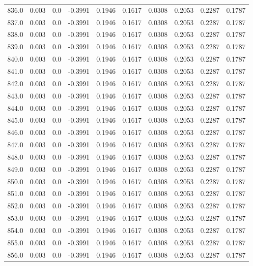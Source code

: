 \begin{longtable}{lrrrrrrrrr}
836.0 & 0.003 & 0.0 & -0.3991 & 0.1946 & 0.1617 & 0.0308 & 0.2053 & 0.2287 & 0.1787 \\
837.0 & 0.003 & 0.0 & -0.3991 & 0.1946 & 0.1617 & 0.0308 & 0.2053 & 0.2287 & 0.1787 \\
838.0 & 0.003 & 0.0 & -0.3991 & 0.1946 & 0.1617 & 0.0308 & 0.2053 & 0.2287 & 0.1787 \\
839.0 & 0.003 & 0.0 & -0.3991 & 0.1946 & 0.1617 & 0.0308 & 0.2053 & 0.2287 & 0.1787 \\
840.0 & 0.003 & 0.0 & -0.3991 & 0.1946 & 0.1617 & 0.0308 & 0.2053 & 0.2287 & 0.1787 \\
841.0 & 0.003 & 0.0 & -0.3991 & 0.1946 & 0.1617 & 0.0308 & 0.2053 & 0.2287 & 0.1787 \\
842.0 & 0.003 & 0.0 & -0.3991 & 0.1946 & 0.1617 & 0.0308 & 0.2053 & 0.2287 & 0.1787 \\
843.0 & 0.003 & 0.0 & -0.3991 & 0.1946 & 0.1617 & 0.0308 & 0.2053 & 0.2287 & 0.1787 \\
844.0 & 0.003 & 0.0 & -0.3991 & 0.1946 & 0.1617 & 0.0308 & 0.2053 & 0.2287 & 0.1787 \\
845.0 & 0.003 & 0.0 & -0.3991 & 0.1946 & 0.1617 & 0.0308 & 0.2053 & 0.2287 & 0.1787 \\
846.0 & 0.003 & 0.0 & -0.3991 & 0.1946 & 0.1617 & 0.0308 & 0.2053 & 0.2287 & 0.1787 \\
847.0 & 0.003 & 0.0 & -0.3991 & 0.1946 & 0.1617 & 0.0308 & 0.2053 & 0.2287 & 0.1787 \\
848.0 & 0.003 & 0.0 & -0.3991 & 0.1946 & 0.1617 & 0.0308 & 0.2053 & 0.2287 & 0.1787 \\
849.0 & 0.003 & 0.0 & -0.3991 & 0.1946 & 0.1617 & 0.0308 & 0.2053 & 0.2287 & 0.1787 \\
850.0 & 0.003 & 0.0 & -0.3991 & 0.1946 & 0.1617 & 0.0308 & 0.2053 & 0.2287 & 0.1787 \\
851.0 & 0.003 & 0.0 & -0.3991 & 0.1946 & 0.1617 & 0.0308 & 0.2053 & 0.2287 & 0.1787 \\
852.0 & 0.003 & 0.0 & -0.3991 & 0.1946 & 0.1617 & 0.0308 & 0.2053 & 0.2287 & 0.1787 \\
853.0 & 0.003 & 0.0 & -0.3991 & 0.1946 & 0.1617 & 0.0308 & 0.2053 & 0.2287 & 0.1787 \\
854.0 & 0.003 & 0.0 & -0.3991 & 0.1946 & 0.1617 & 0.0308 & 0.2053 & 0.2287 & 0.1787 \\
855.0 & 0.003 & 0.0 & -0.3991 & 0.1946 & 0.1617 & 0.0308 & 0.2053 & 0.2287 & 0.1787 \\
856.0 & 0.003 & 0.0 & -0.3991 & 0.1946 & 0.1617 & 0.0308 & 0.2053 & 0.2287 & 0.1787 \\

\end{longtable}
